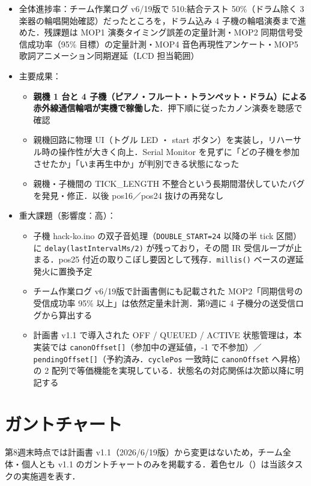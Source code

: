 \documentclass[a4paper,11pt]{ltjsarticle}
\providecommand{\％}{\%}
\begin{document}
\begin{itemize}
    \item 全体進捗率：チーム作業ログ v6/19版で 510:結合テスト 50\%（ドラム除く 3 楽器の輪唱開始確認）だったところを，ドラム込み 4 子機の輪唱演奏まで進めた．残課題は MOP1 演奏タイミング誤差の定量計測・MOP2 同期信号受信成功率（95\% 目標）の定量計測・MOP4 音色再現性アンケート・MOP5 歌詞アニメーション同期遅延（LCD 担当範囲）
    \item 主要成果：
    \begin{itemize}
        \item \textbf{親機 1 台と 4 子機（ピアノ・フルート・トランペット・ドラム）による赤外線通信輪唱が実機で稼働した}．押下順に従ったカノン演奏を聴感で確認
        \item 親機回路に物理 UI（トグル LED ・ start ボタン）を実装し，リハーサル時の操作性が大きく向上．Serial Monitor を見ずに「どの子機を参加させたか」「いま再生中か」が判別できる状態になった
        \item 親機・子機間の TICK\_LENGTH 不整合という長期間潜伏していたバグを発見・修正．以後 pos16／pos24 抜けの再発なし
    \end{itemize}
    \item 重大課題（影響度：高）：
    \begin{itemize}
        \item 子機 hack-ko.ino の双子音処理（\texttt{DOUBLE\_START=24} 以降の半 tick 区間）に \texttt{delay(lastIntervalMs/2)} が残っており，その間 IR 受信ループが止まる．pos25 付近の取りこぼし要因として残存．\texttt{millis()} ベースの遅延発火に置換予定
        \item チーム作業ログ v6/19版で計画書側にも記載された MOP2「同期信号の受信成功率 95\% 以上」は依然定量未計測．第9週に 4 子機分の送受信ログから算出する
        \item 計画書 v1.1 で導入された OFF / QUEUED / ACTIVE 状態管理は，本実装では \texttt{canonOffset[]}（参加中の遅延値，-1 で不参加）／\texttt{pendingOffset[]}（予約済み．\texttt{cyclePos} 一致時に \texttt{canonOffset} へ昇格）の 2 配列で等価機能を実現している．状態名の対応関係は次節以降に明記する
    \end{itemize}
\end{itemize}

\section{ガントチャート}\label{sec:gantt}

第8週末時点では計画書 v1.1（2026/6/19版）から変更はないため，チーム全体・個人とも v1.1 のガントチャートのみを掲載する．着色セル（\colorbox{ganttCell}{\phantom{xx}}）は当該タスクの実施週を表す．
\end{document}
